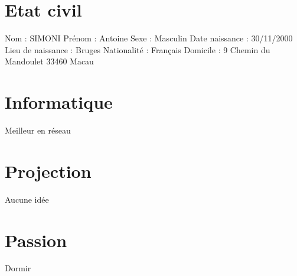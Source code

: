 \documentclass{article}
\begin{document}
\section{Etat civil}
Nom : SIMONI
\newline
Prénom : Antoine
\newline
Sexe : Masculin
\newline
Date naissance : 30/11/2000
\newline
Lieu de naissance : Bruges 
\newline
Nationalité : Français
\newline
Domicile : 9 Chemin du Mandoulet 33460 Macau


\section{Informatique}
Meilleur en réseau

\section{Projection}
Aucune idée

\section{Passion}
Dormir
\end{document}

